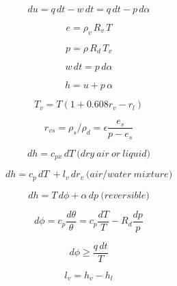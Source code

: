 \documentclass[12pt]{article}
\begin{document}
\begin{multicols}{2}

  \begin{equation}
\label{eq:first}
du = q\,dt - w\,dt = q\,dt - p\,d\alpha
  \end{equation}

\begin{equation}
e = \rho_v\, R_v\, T
\end{equation}

\begin{equation}
p = \rho\, R_d\, T_v
\label{eq:eqstate}
\end{equation}


\begin{equation}
w \,dt = p\,d\alpha
\end{equation}

\begin{equation}
h = u + p \,\alpha
\end{equation}

\begin{equation}
  \label{eq:tv}
  T_v = T(1 + 0.608 r_v - r_l)
\end{equation}

\begin{equation}
  \label{eq:wv}
  r_{vs} = \rho_s/\rho_d = \epsilon \frac{e_s}{p - e_s}
\end{equation}

\begin{equation}
dh = c_{px}\, dT\ \mathrm(dry\ air\ or\ liquid)
\end{equation}

\begin{equation}
dh = c_p\, dT\ + l_v\,dr_v\ \mathrm(air/water\ mixture)
\label{eq:dhdef}
\end{equation}


\begin{equation}
dh = T\,d\phi + \alpha\,dp\ \mathrm(reversible)
\label{eq:reversible}
\end{equation}

\begin{equation}
d\phi = c_p \frac{d\theta}{\theta} = c_p \frac{dT}{T} - R_d \frac{dp}{p}
\label{eq:thetadef}
\end{equation}

\begin{equation}
  \label{eq:dphi}
  d\phi \geq \frac{q\,dt}{T}
\end{equation}

\begin{equation}
l_v = h_v - h_l
\end{equation}



\end{multicols}
\end{document}
